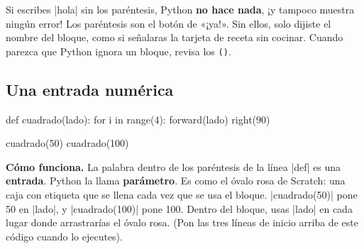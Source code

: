 \begin{watchout}
Si escribes \py|hola| sin los paréntesis, Python \textbf{no hace nada}, ¡y tampoco muestra ningún error! Los paréntesis son el botón de «¡ya!». Sin ellos, solo dijiste el nombre del bloque, como si señalaras la tarjeta de receta sin cocinar. Cuando parezca que Python ignora un bloque, revisa los \texttt{()}.
\end{watchout}

\subsection*{Una entrada numérica}

\begin{tcbraster}[raster columns=2, raster equal height=rows, raster column skip=12pt, raster valign=center, raster force size=false, raster column 1/.style={add to width=-2cm}, raster column 2/.style={add to width=2cm}]
\begin{tcolorbox}[colback=white, colframe=white, boxrule=0pt, valign=center]
\begin{scratch}
\end{scratch}
\par\medskip
\begin{scratch}
\end{scratch}
\end{tcolorbox}
\begin{code}
def cuadrado(lado):
    for i in range(4):
        forward(lado)
        right(90)

cuadrado(50)
cuadrado(100)
\end{code}
\end{tcbraster}

\textbf{Cómo funciona.} La palabra dentro de los paréntesis de la línea \py|def| es una \textbf{entrada}. Python la llama \textbf{parámetro}. Es como el óvalo rosa  de Scratch: una caja con etiqueta que se llena cada vez que se usa el bloque. \py|cuadrado(50)| pone 50 en \py|lado|, y \py|cuadrado(100)| pone 100. Dentro del bloque, usas \py|lado| en cada lugar donde arrastrarías el óvalo rosa. (Pon las tres líneas de inicio arriba de este código cuando lo ejecutes).

